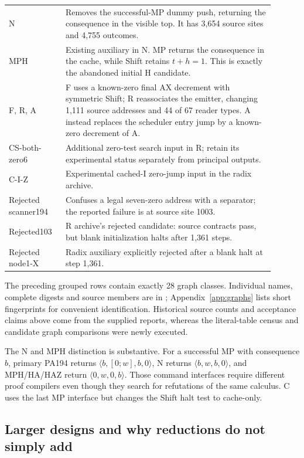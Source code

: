 \documentclass[11pt]{article}
\newcommand{\st}[4]{\langle #1,#2,#3,#4\rangle}
\begin{document}
\begin{longtable}{>{\raggedright\arraybackslash}p{0.19\linewidth}p{0.71\linewidth}}
N & Removes the successful-MP dummy push, returning the consequence in the visible top. It has 3,654 source sites and 4,755 outcomes.\\
MPH & Existing auxiliary in N. MP returns the consequence in the cache, while Shift retains $t+h=1$. This is exactly the abandoned initial H candidate.\\
F, R, A & F uses a known-zero final AX decrement with symmetric Shift; R reassociates the emitter, changing 1,111 source addresses and 44 of 67 reader types. A instead replaces the scheduler entry jump by a known-zero decrement of A.\\
CS-both-zero6 & Additional zero-test search input in R; retain its experimental status separately from principal outputs.\\
C-I-Z & Experimental cached-I zero-jump input in the radix archive.\\
Rejected scanner194 & Confuses a legal seven-zero address with a separator; the reported failure is at source site 1003.\\
Rejected103 & R archive's rejected candidate: source contracts pass, but blank initialization halts after 1,361 steps.\\
Rejected node1-X & Radix auxiliary explicitly rejected after a blank halt at step 1,361.\\
\bottomrule
\end{longtable}
The preceding grouped rows contain exactly 28 graph classes. Individual
names, complete digests and source members are in
; Appendix~\ref{app:graphs} lists
short fingerprints for convenient identification. Historical source counts
and acceptance claims above come from the supplied reports, whereas the
literal-table census and candidate graph comparisons were newly executed.

The N and MPH distinction is substantive. For a successful MP with
consequence $b$, primary PA194 returns $\st{b}{[0;w]}{b}{0}$, N returns
$\st{b}{w}{b}{0}$, and MPH/HA/HAZ return $\st{0}{w}{0}{b}$. Those command
interfaces require different proof compilers even though they search for
refutations of the same calculus. C uses the last MP interface but changes
the Shift halt test to cache-only.

\subsection{Larger designs and why reductions do not simply add}
\end{document}
